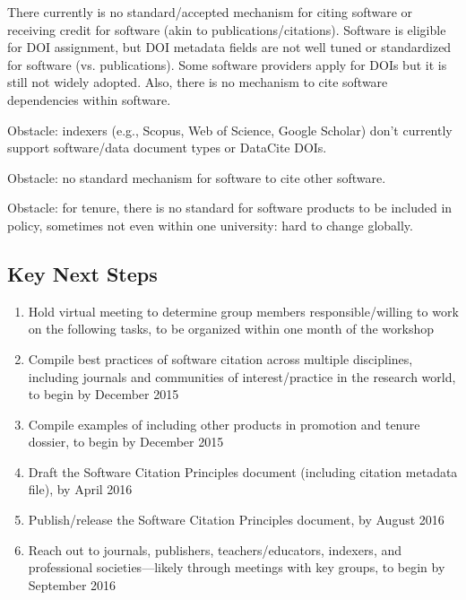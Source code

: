 There currently is no standard/accepted mechanism for citing software or receiving credit for software (akin to publications/citations).
Software is eligible for DOI assignment, but DOI metadata fields are not well tuned or standardized for software (vs. publications).
Some software providers apply for DOIs but it is still not widely adopted.
Also, there is no mechanism to cite software dependencies within software.

Obstacle: indexers (e.g., Scopus, Web of Science, Google Scholar) don't currently support software/data document types or DataCite DOIs.

Obstacle: no standard mechanism for software to cite other software.

Obstacle: for tenure, there is no standard for software products to be included in policy,
sometimes not even within one university: hard to change globally.

\subsection{Key Next Steps}

\begin{enumerate}
\item Hold virtual meeting to determine group members responsible\slash willing to work on the following tasks, to be organized within one month of the workshop
\item Compile best practices of software citation across multiple disciplines, including journals and communities of interest\slash practice in the research world, to begin by December 2015
\item Compile examples of including other products in promotion and tenure dossier, to begin by December 2015
\item Draft the Software Citation Principles document (including citation metadata file), by April 2016
\item Publish\slash release the Software Citation Principles document, by August 2016
\item Reach out to journals, publishers, teachers\slash educators, indexers, and professional societies---likely through meetings with key groups, to begin by September 2016

\end{enumerate}

